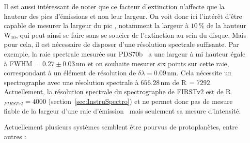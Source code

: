 Il est aussi intéressant de noter que ce facteur d'extinction n'affecte que la hauteur des pics d'émissions et non leur largeur. On voit donc ici l'intérêt d'être capable de mesurer la largeur du pic \ha, notamment la largeur à $10 \, \%$ de la hauteur W$_{10}$, qui peut ainsi se faire sans se soucier de l'extinction au sein du disque. Mais pour cela, il est nécessaire de disposer d'une résolution spectrale suffisante. Par exemple, la raie spectrale mesurée sur PDS70b~\citep{haffert2019} a une largeur à mi hauteur égale à FWHM$\, = 0.27 \pm 0.03 \,$nm et on souhaite mesurer six points sur cette raie, correspondant à un élément de résolution de $\delta\lambda = 0.09 \,$nm. Cela nécessite un spectrographe avec une résolution spectrale à $656.28 \,$nm de R$\, = 7292$. Actuellement, la résolution spectrale du spectrographe de \ac{FIRSTv2} est de R$_{FIRSTv2} = 4000$ (section~\ref{sec:InstruSpectro}) et ne permet donc pas de mesure fiable de la largeur d'une raie d'émission \ha~mais seulement sa mesure d'intensité.

Actuellement plusieurs systèmes semblent être pourvus de protoplanètes, entre autres : 

